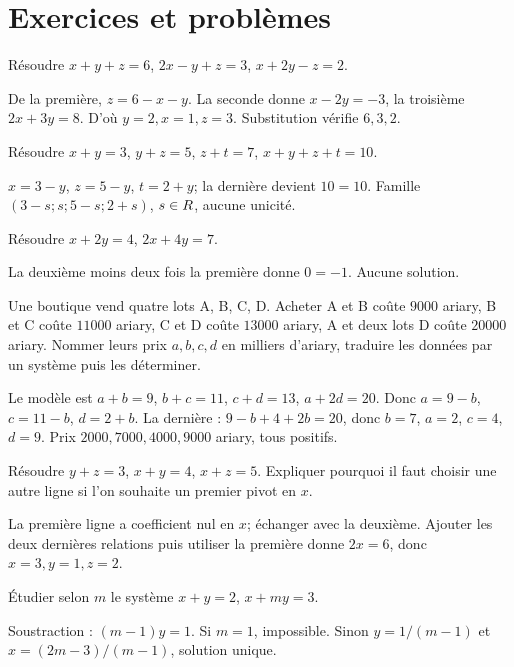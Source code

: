 \section{Exercices et problèmes}
\exo[Éliminer]\label{t11s-c09-e01}
Résoudre $x+y+z=6$, $2x-y+z=3$, $x+2y-z=2$.
\begin{corrige}\label{sol-t11s-c09-e01}
De la première, $z=6-x-y$. La seconde donne $x-2y=-3$, la troisième $2x+3y=8$. D’où $y=2,x=1,z=3$. Substitution vérifie $6,3,2$.
\end{corrige}
\label{t11s-c09-e02}
Résoudre $x+y=3$, $y+z=5$, $z+t=7$, $x+y+z+t=10$.
\begin{corrige}\label{sol-t11s-c09-e02}
$x=3-y$, $z=5-y$, $t=2+y$; la dernière devient $10=10$. Famille $(3-s;s;5-s;2+s)$, $s\in R$, aucune unicité.
\end{corrige}
\exo[Incompatible]\label{t11s-c09-e03}
Résoudre $x+2y=4$, $2x+4y=7$.
\begin{corrige}\label{sol-t11s-c09-e03}
La deuxième moins deux fois la première donne $0=-1$. Aucune solution.
\end{corrige}
\label{t11s-c09-e04}
Une boutique vend quatre lots A, B, C, D. Acheter A et B coûte $9000$ ariary, B et C coûte $11000$ ariary, C et D coûte $13000$ ariary, A et deux lots D coûte $20000$ ariary. Nommer leurs prix $a,b,c,d$ en milliers d’ariary, traduire les données par un système puis les déterminer.
\begin{corrige}\label{sol-t11s-c09-e04}
Le modèle est $a+b=9$, $b+c=11$, $c+d=13$, $a+2d=20$. Donc $a=9-b$, $c=11-b$, $d=2+b$. La dernière : $9-b+4+2b=20$, donc $b=7$, $a=2$, $c=4$, $d=9$. Prix $2000,7000,4000,9000$ ariary, tous positifs.
\end{corrige}
\label{t11s-c09-e05}
Résoudre $y+z=3$, $x+y=4$, $x+z=5$. Expliquer pourquoi il faut choisir une autre ligne si l’on souhaite un premier pivot en $x$.
\begin{corrige}\label{sol-t11s-c09-e05}
La première ligne a coefficient nul en $x$; échanger avec la deuxième. Ajouter les deux dernières relations puis utiliser la première donne $2x=6$, donc $x=3,y=1,z=2$.
\end{corrige}
\exo[Un paramètre]\label{t11s-c09-e06}
Étudier selon $m$ le système $x+y=2$, $x+my=3$.
\begin{corrige}\label{sol-t11s-c09-e06}
Soustraction : $(m-1)y=1$. Si $m=1$, impossible. Sinon $y=1/(m-1)$ et $x=(2m-3)/(m-1)$, solution unique.
\end{corrige}

